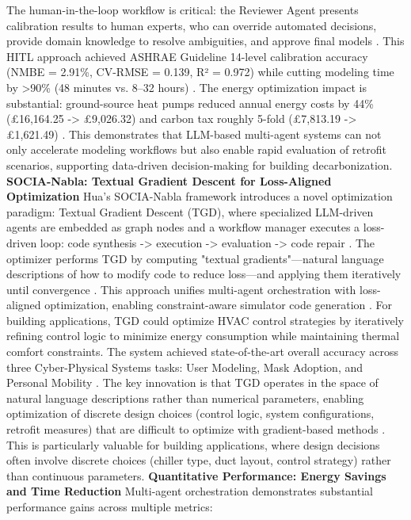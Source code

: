 \documentclass[12pt,a4paper]{article}
\begin{document}
The human-in-the-loop workflow is critical: the Reviewer Agent presents calibration results to human experts, who can override automated decisions, provide domain knowledge to resolve ambiguities, and approve final models \cite{ref36}. This HITL approach achieved ASHRAE Guideline 14-level calibration accuracy (NMBE = 2.91\%, CV-RMSE = 0.139, R² = 0.972) while cutting modeling time by >90\% (48 minutes vs. 8--32 hours) \cite{ref36}.
The energy optimization impact is substantial: ground-source heat pumps reduced annual energy costs by 44\% (£16,164.25 -> £9,026.32) and carbon tax roughly 5-fold (£7,813.19 -> £1,621.49) \cite{ref36}. This demonstrates that LLM-based multi-agent systems can not only accelerate modeling workflows but also enable rapid evaluation of retrofit scenarios, supporting data-driven decision-making for building decarbonization.
\textbf{SOCIA-Nabla: Textual Gradient Descent for Loss-Aligned Optimization}
Hua's SOCIA-Nabla framework introduces a novel optimization paradigm: Textual Gradient Descent (TGD), where specialized LLM-driven agents are embedded as graph nodes and a workflow manager executes a loss-driven loop: code synthesis -> execution -> evaluation -> code repair \cite{ref125}. The optimizer performs TGD by computing "textual gradients"---natural language descriptions of how to modify code to reduce loss---and applying them iteratively until convergence \cite{ref125}.
This approach unifies multi-agent orchestration with loss-aligned optimization, enabling constraint-aware simulator code generation \cite{ref125}. For building applications, TGD could optimize HVAC control strategies by iteratively refining control logic to minimize energy consumption while maintaining thermal comfort constraints. The system achieved state-of-the-art overall accuracy across three Cyber-Physical Systems tasks: User Modeling, Mask Adoption, and Personal Mobility \cite{ref125}.
The key innovation is that TGD operates in the space of natural language descriptions rather than numerical parameters, enabling optimization of discrete design choices (control logic, system configurations, retrofit measures) that are difficult to optimize with gradient-based methods \cite{ref125}. This is particularly valuable for building applications, where design decisions often involve discrete choices (chiller type, duct layout, control strategy) rather than continuous parameters.
\textbf{Quantitative Performance: Energy Savings and Time Reduction}
Multi-agent orchestration demonstrates substantial performance gains across multiple metrics:
\end{document}
